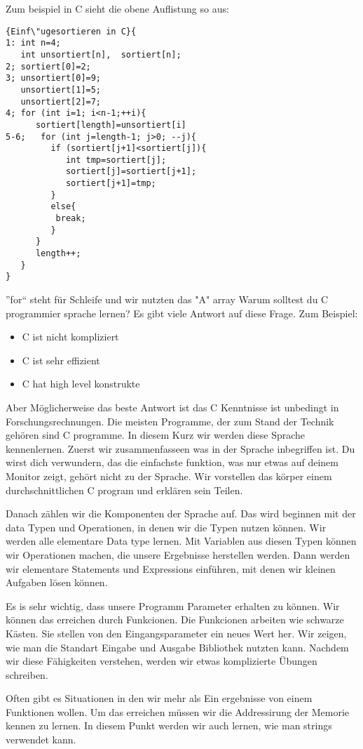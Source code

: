 \documentclass{article}[12pt]
\begin{document}
Zum beispiel in C sieht die obene Auflistung so aus:
\begin{lstlisting}{Einf\"ugesortieren in C}{
1: int n=4;
   int unsortiert[n],  sortiert[n];
2; sortiert[0]=2;
3; unsortiert[0]=9; 
   unsortiert[1]=5;
   unsortiert[2]=7;
4; for (int i=1; i<n-1;++i){
      sortiert[length]=unsortiert[i]
5-6;   for (int j=length-1; j>0; --j){
         if (sortiert[j+1]<sortiert[j]){
            int tmp=sortiert[j];
            sortiert[j]=sortiert[j+1];
            sortiert[j+1]=tmp;
         }
         else{
          break;
         }
      }
      length++;
   }
}
\end{lstlisting}
''for`` steht f\"ur Schleife und wir nutzten das "A" array 
Warum solltest du C programmier sprache lernen? Es gibt viele Antwort auf diese Frage. Zum Beispiel:
\begin{itemize}
\item C ist nicht kompliziert
\item C ist sehr effizient
\item C hat high level konstrukte
\end{itemize}
Aber M\"oglicherweise das beste Antwort ist das C Kenntnisse ist unbedingt in Forschungsrechnungen. Die meisten Programme,
der zum Stand der Technik geh\"oren sind C programme. In diesem Kurz wir werden diese Sprache kennenlernen. Zuerst 
wir zusammenfasseen was in der Sprache inbegriffen ist. Du wirst dich verwundern, das die einfachste funktion, was
nur etwas auf deinem Monitor zeigt, geh\"ort nicht zu der Sprache. Wir vorstellen das k\"orper einem durchschnittlichen
C program und erkl\"aren sein Teilen. 

Danach z\"ahlen wir die Komponenten der Sprache auf. Das wird beginnen mit der data Typen und Operationen, in denen wir 
die Typen nutzen k\"onnen. Wir werden alle elementare Data type lernen. Mit Variablen aus diesen Typen k\"onnen wir Operationen machen, 
die unsere Ergebnisse herstellen werden. Dann werden wir elementare Statements und Expressions einf\"uhren, mit denen 
wir kleinen Aufgaben l\"osen k\"onnen. 
  
Es is sehr wichtig, dass unsere Programm Parameter erhalten zu k\"onnen. Wir k\"onnen das erreichen durch Funkcionen.
Die Funkcionen arbeiten wie schwarze K\"asten. Sie stellen von den Eingangsparameter ein neues Wert her. Wir zeigen, 
wie man die Standart Eingabe und Ausgabe Bibliothek nutzten kann. Nachdem wir diese F\"ahigkeiten verstehen, werden wir etwas
komplizierte \"Ubungen schreiben.

Often gibt es Situationen in den wir mehr als Ein ergebnisse von einem Funktionen wollen. Um das erreichen
m\"ussen wir die Addressirung der Memorie kennen zu lernen. In diesem Punkt werden wir auch lernen, wie man 
strings verwendet kann.
\end{document}
